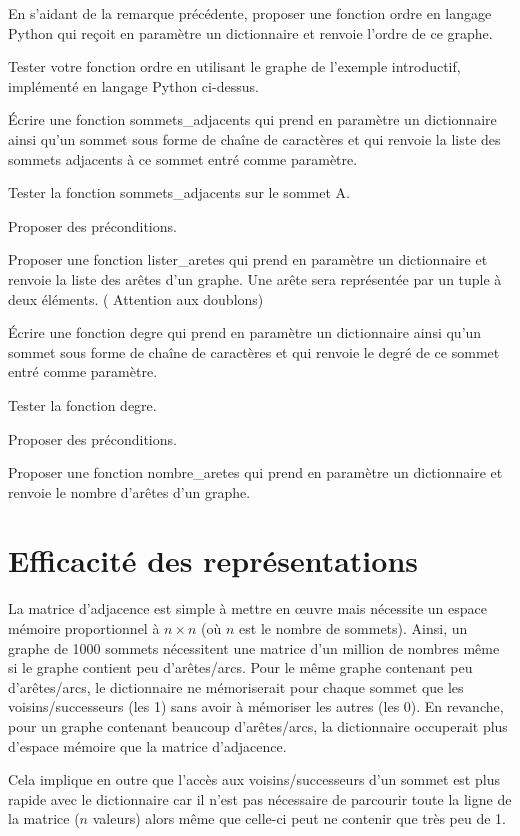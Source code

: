 \documentclass[12pt]{book}
\begin{document}
\Quest En s'aidant de la remarque précédente, proposer une fonction ordre en langage Python qui reçoit en paramètre un dictionnaire et renvoie l'ordre de ce graphe.

\Quest Tester votre fonction ordre en utilisant le graphe de l'exemple introductif, implémenté en langage Python ci-dessus.

\Quest Écrire une fonction sommets\_adjacents qui prend en paramètre un dictionnaire ainsi qu'un sommet sous forme de chaîne de caractères et qui renvoie la liste des sommets adjacents à ce sommet entré comme paramètre.

\Quest Tester la fonction sommets\_adjacents sur le sommet A.

\Quest Proposer des préconditions.

\Quest Proposer une fonction lister\_aretes qui prend en paramètre un dictionnaire et renvoie la liste des arêtes d'un graphe. Une arête sera représentée par un tuple à deux éléments. ( Attention aux doublons)

\Quest Écrire une fonction degre qui prend en paramètre un dictionnaire ainsi qu'un sommet sous forme de chaîne de caractères et qui renvoie le degré de ce sommet entré comme paramètre.

\Quest Tester la fonction degre.

\Quest Proposer des préconditions.

\Quest Proposer une fonction nombre\_aretes qui prend en paramètre un dictionnaire et renvoie le nombre d'arêtes d'un graphe.



\section{Efficacité des représentations}

La matrice d'adjacence est simple à mettre en œuvre mais nécessite un espace mémoire proportionnel à  $n \times n$ (où $n$ est le nombre de sommets). Ainsi, un graphe de 1000 sommets nécessitent une matrice d'un million de nombres même si le graphe contient peu d'arêtes/arcs. Pour le même graphe contenant peu d'arêtes/arcs, le dictionnaire ne mémoriserait pour chaque sommet que les voisins/successeurs (les 1) sans avoir à mémoriser les autres (les 0). En revanche, pour un graphe contenant beaucoup d'arêtes/arcs, la dictionnaire occuperait plus d'espace mémoire que la matrice d'adjacence.

Cela implique en outre que l'accès aux voisins/successeurs d'un sommet est plus rapide avec le dictionnaire car il n'est pas nécessaire de parcourir toute la ligne de la matrice ($n$ valeurs) alors même que celle-ci peut ne contenir que très peu de 1.
\end{document}

